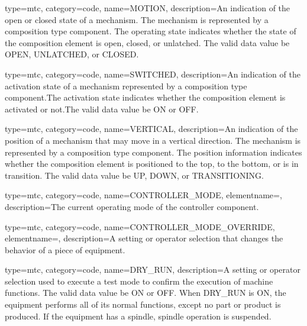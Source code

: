 {
  type=mtc,
  category=code,
  name={MOTION},
  description={An indication of the open or closed state of a mechanism.   The mechanism is represented by a \gls{composition} type component. \newline The operating state indicates whether the state of the \gls{composition} element is open, closed, or unlatched.   \newline The \gls{valid data value} \must be OPEN, UNLATCHED, or CLOSED.}
}

{
  type=mtc,
  category=code,
  name={SWITCHED},
  description={An indication of the activation state of a mechanism represented by a \gls{composition} type component.The activation state indicates whether the \gls{composition} element is activated or not.The \gls{valid data value} \must be ON or OFF.}
}

{
  type=mtc,
  category=code,
  name={VERTICAL},
  description={An indication of the position of a mechanism that may move in a vertical direction. The mechanism is represented by a \gls{composition} type component. \newline The position information indicates whether the \gls{composition} element is positioned to the top, to the bottom, or is in transition.  \newline The \gls{valid data value} \must be UP, DOWN, or TRANSITIONING.}
}

{
  type=mtc,
  category=code,
  name={CONTROLLER\_MODE},
  elementname=,
  description={The current operating mode of the \gls{controller} component.}
}

{
  type=mtc,
  category=code,
  name={CONTROLLER\_MODE\_OVERRIDE},
  elementname=,
  description={A setting or operator selection that changes the behavior of a piece of equipment.}
}

{
  type=mtc,
  category=code,
  name={DRY\_RUN},
  description={A setting or operator selection used to execute a test mode to confirm the execution of machine functions.  The \gls{valid data value} \must be ON or OFF. \newline When DRY\_RUN is ON, the equipment performs all of its normal functions, except no part or product is produced.  If the equipment has a spindle, spindle operation is suspended.}
}

